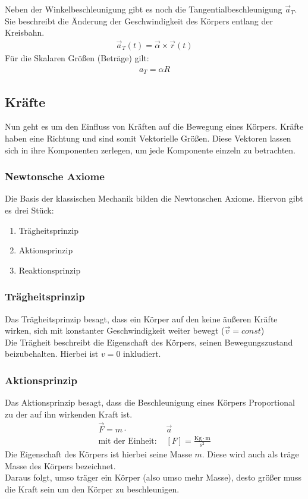 \documentclass{article}
\begin{document}
\noindent Neben der Winkelbeschleunigung gibt es noch die Tangentialbeschleunigung $\vec{a}_T$. Sie beschreibt die Änderung
der Geschwindigkeit des Körpers entlang der Kreisbahn.
\begin{align}
    \vec{a}_T(t)=\vec{\alpha}\times \vec{r}(t)
\end{align}
Für die Skalaren Größen (Beträge) gilt:
\begin{align}
    a_T=\alpha R
\end{align}


\subsection{Kräfte}
Nun geht es um den Einfluss von Kräften auf die Bewegung eines Körpers. Kräfte haben eine Richtung und sind somit Vektorielle Größen.
Diese Vektoren lassen sich in ihre Komponenten zerlegen, um jede Komponente einzeln zu betrachten.

\subsubsection{Newtonsche Axiome}
Die Basis der klassischen Mechanik bilden die Newtonschen Axiome. 
Hiervon gibt es drei Stück:
\begin{enumerate}
    \item Trägheitsprinzip
    \item Aktionsprinzip
    \item Reaktionsprinzip
\end{enumerate}

\subsubsection*{Trägheitsprinzip}
Das Trägheitsprinzip besagt, dass ein Körper auf den keine äußeren Kräfte wirken, sich mit konstanter Geschwindigkeit weiter bewegt
($\vec{v}=const$)\\

\noindent Die Trägheit beschreibt die Eigenschaft des Körpers, seinen Bewegungszustand beizubehalten. Hierbei ist $v=0$ inkludiert.


\subsubsection*{Aktionsprinzip}
Das Aktionsprinzip besagt, dass die Beschleunigung eines Körpers Proportional zu der auf ihn wirkenden Kraft ist.
\begin{align}
    \vec{F}=m\cdot &\vec{a}\\
    \text{mit der Einheit: }&[F]=\frac{\mathrm{Kg}\cdot \mathrm{m}}{\mathrm{s}^2}
\end{align}
Die Eigenschaft des Körpers ist hierbei seine Masse $m$. Diese wird auch als träge Masse des Körpers bezeichnet.\\
Daraus folgt, umso träger ein Körper (also umso mehr Masse), desto größer muss die Kraft sein um den Körper zu beschleunigen.\\
\end{document}
